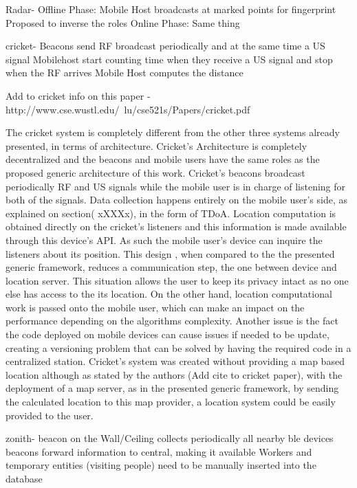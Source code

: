 Radar-		Offline Phase:
				Mobile Host broadcasts at marked points for fingerprint
				Proposed to inverse the roles
			Online Phase:
				Same thing




cricket- 	Beacons send RF broadcast periodically and at the same time a US signal
			Mobilehost start counting time when they receive a US signal and stop when the RF arrives
			Mobile Host computes the distance

Add to cricket info on this paper - http://www.cse.wustl.edu/~lu/cse521s/Papers/cricket.pdf


The cricket system is completely different from the other three systems already presented, in terms of architecture. Cricket's Architecture is completely decentralized and the beacons and mobile users have the same roles as the proposed generic architecture of this work. Cricket's beacons broadcast periodically RF and US signals while the mobile user is in charge of listening for both of the signals. Data collection happens entirely on the mobile user's side, as explained on section( xXXXx), in the form of \ac{TDoA}. Location computation is obtained directly on the cricket's listeners and this information is made available through this device's API. As such the mobile user's device can inquire the listeners about its position. This design , when compared to the the presented generic framework, reduces a communication step, the one between device and location server. This situation allows the user to keep its privacy intact as no one else has access to the its location. On the other hand, location computational work is passed onto the mobile user, which can make an impact on the performance depending on the algorithms complexity. Another issue is the fact the code deployed on mobile devices can cause issues if needed to be update, creating a versioning problem that can be solved by having the required code in a centralized station. Cricket's system was created without providing a map based location although as stated by the authors (Add cite to cricket paper), with the deployment of a map server, as in the presented generic framework, by sending the calculated location to this map provider, a location system could be easily provided to the user.


zonith- 	beacon on the Wall/Ceiling collects periodically all nearby ble devices
			beacons forward information to central, making it available
			Workers and temporary entities (visiting people) need to be manually inserted into the database

